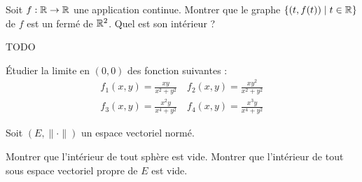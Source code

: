 \documentclass{report}
\begin{document}
\begin{exo}
    Soit \(f:\mathbb{R}\to\mathbb{R}\) une application continue. Montrer que le graphe
    \(\{(t,f(t))\mid t\in\mathbb{R}\}\) de \(f\) est un fermé de \(\mathbb{R}^2\). Quel
    est son intérieur ?
\end{exo}

\begin{exo}
    TODO
\end{exo}

\begin{exo}
    Étudier la limite en \((0,0)\) des fonction suivantes :
    \begin{align*}
        f_1(x,y)=\frac{xy}{x^2+y^2} \quad
        f_2(x,y)=\frac{xy^2}{x^2+y^2} \\
        f_3(x,y)=\frac{x^2y}{x^4+y^2} \quad
        f_4(x,y)=\frac{x^3y}{x^4+y^2}
    \end{align*}
\end{exo}

\begin{exo}
    Soit \(\left(E,\|\cdot\|\right)\) un espace vectoriel normé.
    \begin{enumerate}
        \itt Montrer que l'intérieur de tout sphère est vide.
        \itt Montrer que l'intérieur de tout sous espace vectoriel
        propre de \(E\) est vide.
    \end{enumerate}
\end{exo}
\end{document}
